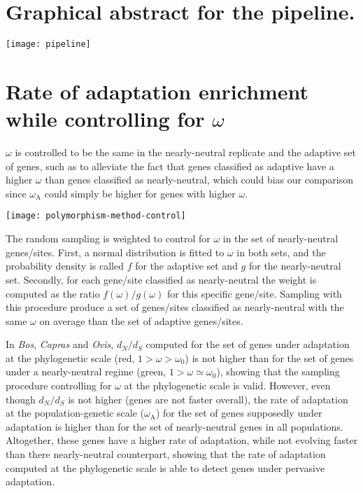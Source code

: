 \documentclass{article}
\renewcommand*{\bm}[1]{#1}%
\newcommand{\dn}{d_N}
\newcommand{\ds}{d_S}
\newcommand{\dnds}{\dn / \ds}
\newcommand{\rateApop}{\omega_{\mathrm{A}}}
\begin{document}
    \pagebreak


    \section{Graphical abstract for the pipeline.}
    \label{subsec:method-summary}

    \begin{center}
        \texttt{[image: pipeline]}
    \end{center}

    \pagebreak


    \section{Rate of adaptation enrichment while controlling for $\bm{\omega}$}
    \label{sec:controlling-for-omega}

    $\omega$ is controlled to be the same in the nearly-neutral replicate and the adaptive set of genes, such as to alleviate the fact that genes classified as adaptive have a higher $\omega$ than genes classified as nearly-neutral, which could bias our comparison since $\rateApop$ could simply be higher for genes with higher $\omega$.

    \begin{center}
        \texttt{[image: polymorphism-method-control]}
    \end{center}

    The random sampling is weighted to control for $\omega$ in the set of nearly-neutral genes/sites.
    First, a normal distribution is fitted to $\omega$ in both sets, and the probability density is called $f$ for the adaptive set and $g$ for the nearly-neutral set.
    Secondly, for each gene/site classified as nearly-neutral the weight is computed as the ratio $f(\omega)/g(\omega)$ for this specific gene/site.
    Sampling with this procedure produce a set of genes/sites classified as nearly-neutral with the same $\omega$ on average than the set of adaptive genes/sites.

    

    In \textit{Bos}, \textit{Capras} and \textit{Ovis}, $\dnds$ computed for the set of genes under adaptation at the phylogenetic scale (red, $1 > \omega > \omega_{0}$) is not higher than for the set of genes under a nearly-neutral regime (green, $1 > \omega \simeq \omega_{0}$), showing that the sampling procedure controlling for $\omega$ at the phylogenetic scale is valid.
    However, even though $\dnds$ is not higher (genes are not faster overall), the rate of adaptation at the population-genetic scale ($\rateApop$) for the set of genes supposedly under adaptation is higher than for the set of nearly-neutral genes in all populations.
    Altogether, these genes have a higher rate of adaptation, while not evolving faster than there nearly-neutral counterpart, showing that the rate of adaptation computed at the phylogenetic scale is able to detect genes under pervasive adaptation.
\end{document}

